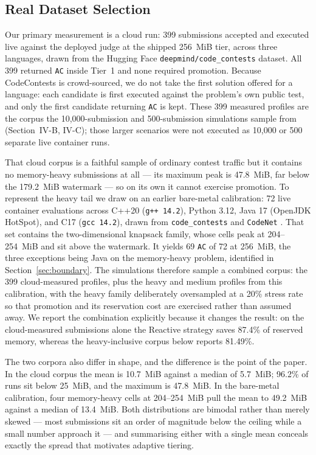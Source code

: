 \documentclass[conference]{IEEEtran}
\begin{document}
\subsection{Real Dataset Selection}
Our primary measurement is a cloud run: 399 submissions accepted and executed live against the deployed judge at the shipped 256~MiB tier, across three languages, drawn from the Hugging Face \texttt{deepmind/code\_contests} \cite{li2022alphacode} dataset. All 399 returned \texttt{AC} inside Tier~1 and none required promotion. Because CodeContests is crowd-sourced, we do not take the first solution offered for a language: each candidate is first executed against the problem's own public test, and only the first candidate returning \texttt{AC} is kept. These 399 measured profiles are the corpus the 10,000-submission and 500-submission simulations sample from (Section~IV-B, IV-C); those larger scenarios were not executed as 10,000 or 500 separate live container runs.

That cloud corpus is a faithful sample of ordinary contest traffic but it contains no memory-heavy submissions at all --- its maximum peak is 47.8~MiB, far below the 179.2~MiB watermark --- so on its own it cannot exercise promotion. To represent the heavy tail we draw on an earlier bare-metal calibration: 72 live container evaluations across C++20 (\texttt{g++ 14.2}), Python 3.12, Java 17 (OpenJDK HotSpot), and C17 (\texttt{gcc 14.2}), drawn from \texttt{code\_contests} and \texttt{CodeNet} \cite{puri2021codenet}. That set contains the two-dimensional knapsack family, whose cells peak at 204--254~MiB and sit above the watermark. It yields 69 \texttt{AC} of 72 at 256~MiB, the three exceptions being Java on the memory-heavy problem, identified in Section~\ref{sec:boundary}. The simulations therefore sample a combined corpus: the 399 cloud-measured profiles, plus the heavy and medium profiles from this calibration, with the heavy family deliberately oversampled at a 20\% stress rate so that promotion and its reservation cost are exercised rather than assumed away. We report the combination explicitly because it changes the result: on the cloud-measured submissions alone the Reactive strategy saves 87.4\% of reserved memory, whereas the heavy-inclusive corpus below reports 81.49\%.

The two corpora also differ in shape, and the difference is the point of the paper. In the cloud corpus the mean is 10.7~MiB against a median of 5.7~MiB; 96.2\% of runs sit below 25~MiB, and the maximum is 47.8~MiB. In the bare-metal calibration, four memory-heavy cells at 204--254~MiB pull the mean to 49.2~MiB against a median of 13.4~MiB. Both distributions are bimodal rather than merely skewed --- most submissions sit an order of magnitude below the ceiling while a small number approach it --- and summarising either with a single mean conceals exactly the spread that motivates adaptive tiering.
\end{document}
